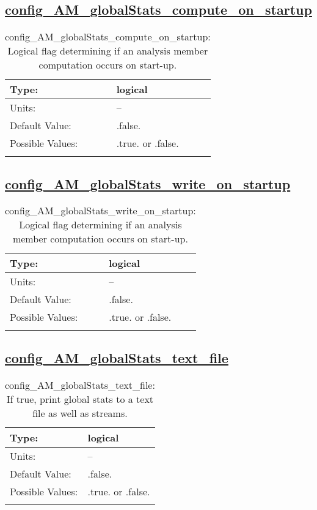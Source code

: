 \subsection[config\_AM\_globalStats\_compute\_on\_startup]{\hyperref[sec:nm_tab_AM_globalStats]{config\_AM\_globalStats\_compute\_on\_startup}}
\label{subsec:nm_sec_config_AM_globalStats_compute_on_startup}
\begin{center}
\begin{longtable}{| p{2.0in} || p{4.0in} |}
    \hline
    Type: & logical \\
    \hline
    Units: & -- \\
    \hline
    Default Value: & .false. \\
    \hline
    Possible Values: & .true. or .false. \\
    \hline
    \caption{config\_AM\_globalStats\_compute\_on\_startup: Logical flag determining if an analysis member computation occurs on start-up.}
\end{longtable}
\end{center}
\subsection[config\_AM\_globalStats\_write\_on\_startup]{\hyperref[sec:nm_tab_AM_globalStats]{config\_AM\_globalStats\_write\_on\_startup}}
\label{subsec:nm_sec_config_AM_globalStats_write_on_startup}
\begin{center}
\begin{longtable}{| p{2.0in} || p{4.0in} |}
    \hline
    Type: & logical \\
    \hline
    Units: & -- \\
    \hline
    Default Value: & .false. \\
    \hline
    Possible Values: & .true. or .false. \\
    \hline
    \caption{config\_AM\_globalStats\_write\_on\_startup: Logical flag determining if an analysis member computation occurs on start-up.}
\end{longtable}
\end{center}
\subsection[config\_AM\_globalStats\_text\_file]{\hyperref[sec:nm_tab_AM_globalStats]{config\_AM\_globalStats\_text\_file}}
\label{subsec:nm_sec_config_AM_globalStats_text_file}
\begin{center}
\begin{longtable}{| p{2.0in} || p{4.0in} |}
    \hline
    Type: & logical \\
    \hline
    Units: & -- \\
    \hline
    Default Value: & .false. \\
    \hline
    Possible Values: & .true. or .false. \\
    \hline
    \caption{config\_AM\_globalStats\_text\_file: If true, print global stats to a text file as well as streams.}
\end{longtable}
\end{center}
